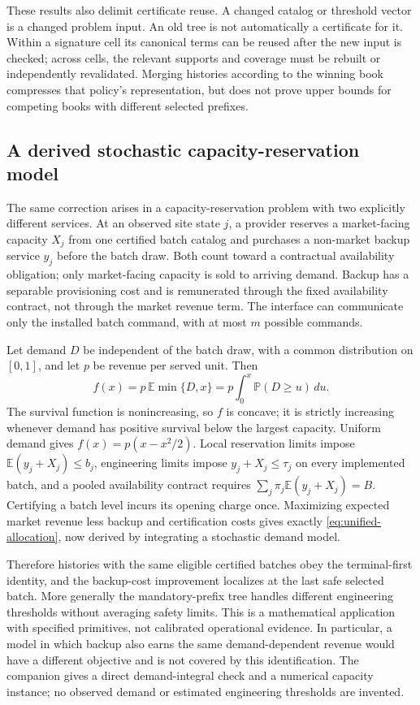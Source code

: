 These results also delimit certificate reuse. A changed catalog or threshold vector is a changed problem input. An old tree is not automatically a certificate for it. Within a signature cell its canonical terms can be reused after the new input is checked; across cells, the relevant supports and coverage must be rebuilt or independently revalidated. Merging histories according to the winning book compresses that policy's representation, but does not prove upper bounds for competing books with different selected prefixes.

\subsection{A derived stochastic capacity-reservation model}\label{sec:r51-capacity}
The same correction arises in a capacity-reservation problem with two explicitly different services. At an observed site state $j$, a provider reserves a market-facing capacity $X_j$ from one certified batch catalog and purchases a non-market backup service $y_j$ before the batch draw. Both count toward a contractual availability obligation; only market-facing capacity is sold to arriving demand. Backup has a separable provisioning cost and is remunerated through the fixed availability contract, not through the market revenue term. The interface can communicate only the installed batch command, with at most $m$ possible commands.

Let demand $D$ be independent of the batch draw, with a common distribution on $[0,1]$, and let $p$ be revenue per served unit. Then
\begin{equation}\label{eq:r51-demand}
 f(x)=p\,\mathbb E\min\{D,x\}
     =p\int_0^x\mathbb P(D\geq u)\,du.
\end{equation}
The survival function is nonincreasing, so $f$ is concave; it is strictly increasing whenever demand has positive survival below the largest capacity. Uniform demand gives $f(x)=p(x-x^2/2)$. Local reservation limits impose $\mathbb E(y_j+X_j)\leq b_j$, engineering limits impose $y_j+X_j\leq\tau_j$ on every implemented batch, and a pooled availability contract requires $\sum_j\pi_j\mathbb E(y_j+X_j)=B$. Certifying a batch level incurs its opening charge once. Maximizing expected market revenue less backup and certification costs gives exactly \eqref{eq:unified-allocation}, now derived by integrating a stochastic demand model.

Therefore histories with the same eligible certified batches obey the terminal-first identity, and the backup-cost improvement localizes at the last safe selected batch. More generally the mandatory-prefix tree handles different engineering thresholds without averaging safety limits. This is a mathematical application with specified primitives, not calibrated operational evidence. In particular, a model in which backup also earns the same demand-dependent revenue would have a different objective and is not covered by this identification. The companion gives a direct demand-integral check and a numerical capacity instance; no observed demand or estimated engineering thresholds are invented.
